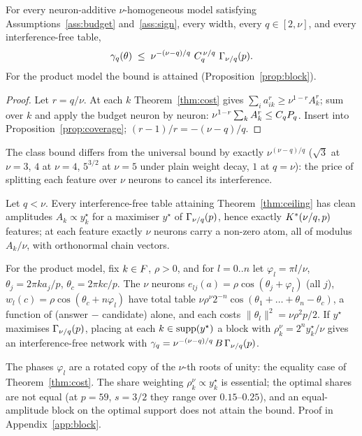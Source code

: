 \begin{theorem}
\label{thm:ceiling}
For every neuron-additive $\nu$-homogeneous model satisfying Assumptions~\ref{ass:budget}
and~\ref{ass:sign}, every width, every $q\in[2,\nu]$, and every interference-free table,
\begin{equation}
  \gam(\theta)\;\le\;\nu^{-(\nu-q)/q}\ C_q^{\,\nu/q}\ \Gam_{\nu/q}(p).
\end{equation}
For the product model the bound is attained (Proposition~\ref{prop:block}).
\end{theorem}
\begin{proof}
Let $r=q/\nu$. At each $k$ Theorem~\ref{thm:cost} gives $\sum_ia_{ik}^r\ge\nu^{1-r}A_k^r$; sum over $k$
and apply the budget neuron by neuron: $\nu^{1-r}\sum_kA_k^r\le C_qP_q$. Insert into
Proposition~\ref{prop:coverage}; $(r-1)/r=-(\nu-q)/q$.
\end{proof}
The class bound differs from the universal bound by exactly $\nu^{(\nu-q)/q}$ ($\sqrt3$ at $\nu=3$, $4$
at $\nu=4$, $5^{3/2}$ at $\nu=5$ under plain weight decay, $1$ at $q=\nu$): the price of splitting each
feature over $\nu$ neurons to cancel its interference.

\begin{corollary}
\label{cor:count}
Let $q<\nu$. Every interference-free table attaining Theorem~\ref{thm:ceiling} has clean amplitudes
$A_k\propto y^\star_k$ for a maximiser $y^\star$ of $\Gamma_{\nu/q}(p)$, hence exactly $K^{*}(\nu/q,p)$
features; at each feature exactly $\nu$ neurons carry a non-zero atom, all of modulus $A_k/\nu$, with
orthonormal chain vectors.
\end{corollary}

\begin{proposition}
\label{prop:block}
For the product model, fix $k\in F$, $\rho>0$, and for $l=0..n$ let $\varphi_l=\pi l/\nu$,
$\theta_j=2\pi ka_j/p$, $\theta_c=2\pi kc/p$. The $\nu$ neurons
$e_{lj}(a)=\rho\cos(\theta_j+\varphi_l)$ (all $j$), $w_l(c)=\rho\cos(\theta_c+n\varphi_l)$ have total table
$\nu\rho^\nu2^{-n}\cos(\theta_1+\dots+\theta_n-\theta_c)$, a function of (answer $-$ candidate) alone,
and each costs $\|\theta_l\|^2=\nu\rho^2p/2$. If $y^\star$ maximises $\Gamma_{\nu/q}(p)$, placing at each
$k\in\operatorname{supp}(y^\star)$ a block with $\rho_k^\nu=2^ny^\star_k/\nu$ gives an interference-free network with
$\gamma_q=\nu^{-(\nu-q)/q}\,B\,\Gamma_{\nu/q}(p)$.
\end{proposition}
The phases $\varphi_l$ are a rotated copy of the $\nu$-th roots of unity: the equality case of
Theorem~\ref{thm:cost}. The share weighting $\rho_k^\nu\propto y^\star_k$ is essential; the optimal
shares are not equal (at $p=59$, $s=3/2$ they range over $0.15$--$0.25$), and an equal-amplitude block on
the optimal support does not attain the bound. Proof in Appendix~\ref{app:block}.

